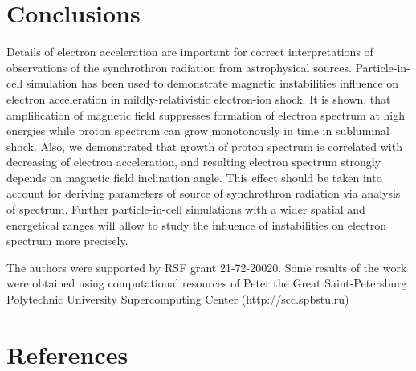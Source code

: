 \documentclass[a4paper]{jpconf}
\begin{document}
	
	\section{Conclusions}
	
	Details of electron acceleration are important for correct interpretations of observations of the  synchrothron radiation from astrophysical sources. Particle-in-cell simulation has been used to demonstrate magnetic instabilities influence on electron acceleration in mildly-relativistic electron-ion shock. It is shown, that amplification of magnetic field suppresses formation of electron spectrum at high energies while proton spectrum can grow monotonously in time in subluminal shock. Also, we demonstrated that growth of proton spectrum is correlated with decreasing of electron acceleration, and resulting  electron spectrum strongly depends on magnetic field inclination angle. This effect should be taken into account for deriving parameters of source of synchrothron radiation via analysis of spectrum. Further particle-in-cell simulations with a wider spatial and energetical ranges will allow to study the influence of instabilities on electron spectrum more precisely.
	
	
	\ack
	The authors were supported by RSF grant 21-72-20020.
	Some results of the work were obtained using computational resources of Peter the Great Saint-Petersburg Polytechnic University Supercomputing Center (http://scc.spbstu.ru)
	
	\section*{References}
	

	
\end{document}

